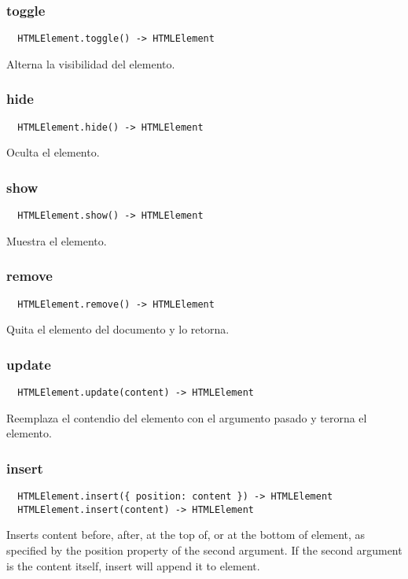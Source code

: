 \subsubsection*{toggle}
\begin{verbatim}
  HTMLElement.toggle() -> HTMLElement
\end{verbatim}
Alterna la visibilidad del elemento.

\subsubsection*{hide}
\begin{verbatim}
  HTMLElement.hide() -> HTMLElement
\end{verbatim}
Oculta el elemento.

\subsubsection*{show}
\begin{verbatim}
  HTMLElement.show() -> HTMLElement
\end{verbatim}
Muestra el elemento.

\subsubsection*{remove}
\begin{verbatim}
  HTMLElement.remove() -> HTMLElement
\end{verbatim}
Quita el elemento del documento y lo retorna.

\subsubsection*{update}
\begin{verbatim}
  HTMLElement.update(content) -> HTMLElement
\end{verbatim}
Reemplaza el contendio del elemento con el argumento pasado y terorna el elemento.

\subsubsection*{insert}
\begin{verbatim}
  HTMLElement.insert({ position: content }) -> HTMLElement
  HTMLElement.insert(content) -> HTMLElement
\end{verbatim}
Inserts content before, after, at the top of, or at the bottom of element, as specified by the position property of the second argument. If the second argument is the content itself, insert will append it to element.

